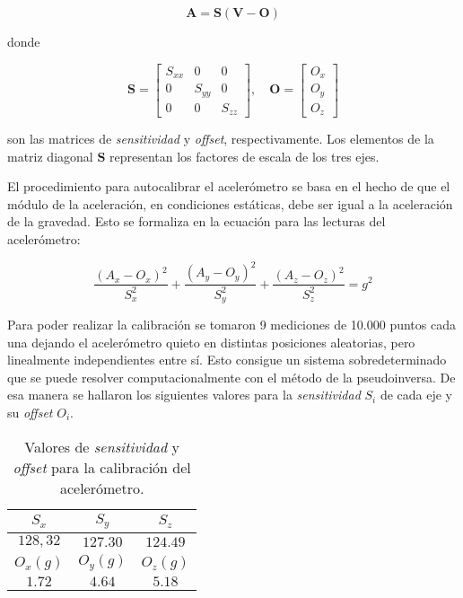 \documentclass[../main.tex]{subfiles}
\begin{document}
\begin{equation*}
\mathbf{A} = \mathbf{S}(\mathbf{V} - \mathbf{O})
\end{equation*}

donde

\begin{equation*}
   \mathbf{S}=\left[\begin{array}{ccc}
    S_{x x} & 0 & 0 \\
    0 & S_{y y} & 0 \\
    0 & 0 & S_{z z}
    \end{array}\right], \quad \mathbf{O}=\left[\begin{array}{c}
    O_{x} \\
    O_{y} \\
    O_{z}
    \end{array}\right] 
\end{equation*}

son las matrices de \textit{sensitividad} y \textit{offset}, respectivamente. Los elementos de la matriz diagonal $\mathbf{S}$ representan los factores de escala de los tres ejes. 

El procedimiento para autocalibrar el acelerómetro se basa en el hecho de que el módulo de la aceleración, en condiciones estáticas, debe ser igual a la aceleración de la gravedad. Esto se formaliza en la ecuación para las lecturas del acelerómetro: 

\begin{equation*}
    \frac{\left(A_{x}-O_{x}\right)^{2}}{S_{x}^{2}}+\frac{\left(A_{y}-O_{y}\right)^{2}}{S_{y}^{2}}+\frac{\left(A_{z}-O_{z}\right)^{2}}{S_{z}^{2}}=g^{2}
\end{equation*}

Para poder realizar la calibración se tomaron 9 mediciones de 10.000 puntos cada una dejando el acelerómetro quieto en distintas posiciones aleatorias, pero linealmente independientes entre sí. Esto consigue un sistema sobredeterminado que se puede resolver computacionalmente con el método de la pseudoinversa. De esa manera se hallaron los siguientes valores para la \textit{sensitividad} $S_i$ de cada eje y su \textit{offset} $O_i$. 

\begin{table}[H]
\centering
\begin{tabular}{ccc}
\hline$S_{x}$ & $S_{y}$ & $S_{z}$ \\
\hline$128,32$ & $127.30$ & $124.49$ \\
\hline \hline$O_{x}(g)$ & $O_{y}(g)$ & $O_{z}(g)$ \\
\hline$1.72$ & $4.64$ & $5.18$
\end{tabular}
\label{tab:calibracion}
\caption{Valores de \textit{sensitividad} y \textit{offset} para la calibración del acelerómetro.}
\end{table}
\end{document}
